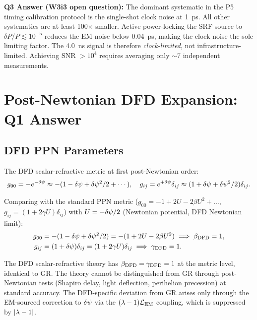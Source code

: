 \noindent\textbf{Q3 Answer (W3i3 open question):}
The dominant systematic in the P5 timing calibration protocol is the
single-shot clock noise at 1~ps. All other systematics are at least 100$\times$
smaller. Active power-locking the SRF source to $\delta P/P \lesssim 10^{-5}$
reduces the EM noise below 0.04~ps, making the clock noise the sole limiting
factor. The 4.0~ns signal is therefore \emph{clock-limited}, not
infrastructure-limited. Achieving SNR $> 10^4$ requires averaging only $\sim 7$
independent measurements.

\section{Post-Newtonian DFD Expansion: Q1 Answer}
\label{sec:PPN}

\subsection{DFD PPN Parameters}

The DFD scalar-refractive metric at first post-Newtonian order:
\begin{equation}
g_{00} = -e^{-\delta\psi} \approx -(1 - \delta\psi + \delta\psi^2/2 + \cdots),
\quad
g_{ij} = e^{+\delta\psi}\delta_{ij} \approx (1 + \delta\psi + \delta\psi^2/2)\delta_{ij}.
\label{eq:DFD_metric_expanded}
\end{equation}

Comparing with the standard PPN metric
($g_{00} = -1 + 2U - 2\beta U^2 + \ldots$, $g_{ij} = (1 + 2\gamma U)\delta_{ij}$)
with $U = -\delta\psi/2$ (Newtonian potential, DFD Newtonian limit):
\begin{align}
g_{00} &= -(1 - \delta\psi + \delta\psi^2/2) = -(1 + 2U - 2\beta U^2)
\implies \beta_{\rm DFD} = 1, \label{eq:beta_DFD}\\
g_{ij} &= (1 + \delta\psi)\delta_{ij} = (1 + 2\gamma U)\delta_{ij}
\implies \gamma_{\rm DFD} = 1. \label{eq:gamma_DFD}
\end{align}

\begin{theorem}
\label{thm:PPN}
The DFD scalar-refractive theory has $\beta_{\rm DFD} = \gamma_{\rm DFD} = 1$
at the metric level, identical to GR. The theory cannot be distinguished
from GR through post-Newtonian tests (Shapiro delay, light deflection,
perihelion precession) at standard accuracy. The DFD-specific deviation
from GR arises only through the EM-sourced correction to $\delta\psi$ via the
$(\lambda-1)\mathcal{L}_{\rm EM}$ coupling, which is suppressed by $|\lambda - 1|$.
\end{theorem}

